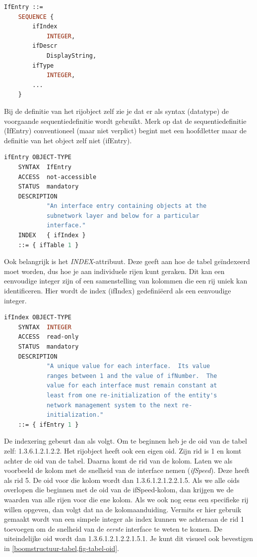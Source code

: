 \begin{lstlisting}[language=asn.1, float=h, caption={Sequentiedefinitie van een tabelrij}, label=definitie-sequentie-rij]
IfEntry ::=
	SEQUENCE {
		ifIndex
			INTEGER,
		ifDescr
			DisplayString,
		ifType
			INTEGER,
		...
	}
\end{lstlisting}

Bij de definitie van het rijobject zelf zie je dat er als syntax (datatype) de voorgaande sequentiedefinitie wordt gebruikt.
Merk op dat de sequentiedefinitie (IfEntry) conventioneel (maar niet verplict) begint met een hoofdletter maar de definitie van het object zelf niet (ifEntry).

\begin{lstlisting}[language=asn.1, float=h, caption={Definitie van een rijobject}, label=definitie-rijobject]
ifEntry OBJECT-TYPE
	SYNTAX	IfEntry
	ACCESS	not-accessible
	STATUS	mandatory
	DESCRIPTION
			"An interface entry containing objects at the
			subnetwork layer and below for a particular
			interface."
	INDEX	{ ifIndex }
	::= { ifTable 1 }
\end{lstlisting}

Ook belangrijk is het \textit{INDEX}-attribuut. Deze geeft aan hoe de tabel geïndexeerd moet worden, dus hoe je aan individuele rijen kunt geraken.
Dit kan een eenvoudige integer zijn of een samenstelling van kolommen die een rij uniek kan identificeren.
Hier wordt de index (ifIndex) gedefiniëerd als een eenvoudige integer.

\begin{lstlisting}[language=asn.1, float=h, caption={Definitie van een index}, label=definitie-ifindex]
ifIndex OBJECT-TYPE
	SYNTAX	INTEGER
	ACCESS	read-only
	STATUS	mandatory
	DESCRIPTION
			"A unique value for each interface.  Its value
			ranges between 1 and the value of ifNumber.  The
			value for each interface must remain constant at
			least from one re-initialization of the entity's
			network management system to the next re-
			initialization."
	::= { ifEntry 1 }
\end{lstlisting}

De indexering gebeurt dan als volgt. Om te beginnen heb je de \gls{oid} van de tabel zelf: 1.3.6.1.2.1.2.2.
Het rijobject heeft ook een eigen \gls{oid}. Zijn \gls{rid} is 1 en komt achter de \gls{oid} van de tabel.
Daarna komt de \gls{rid} van de kolom. Laten we als voorbeeld de kolom met de snelheid van de interface nemen (\textit{ifSpeed}).
Deze heeft als \gls{rid} 5. De \gls{oid} voor die kolom wordt dan 1.3.6.1.2.1.2.2.1.5.
Als we alle \glspl{oid} overlopen die beginnen met de \gls{oid} van de ifSpeed-kolom, dan krijgen we de waarden van alle rijen voor die ene kolom.
Als we ook nog eens een specifieke rij willen opgeven, dan volgt dat na de kolomaanduiding.
Vermits er hier gebruik gemaakt wordt van een simpele integer als index kunnen we achteraan de \gls{rid} 1 toevoegen om 
de snelheid van de \emph{eerste} interface te weten te komen. De uiteindelijke \gls{oid} wordt dan 1.3.6.1.2.1.2.2.1.5.1.
Je kunt dit visueel ook bevestigen in \cref{boomstructuur-tabel,fig-tabel-oid}.

